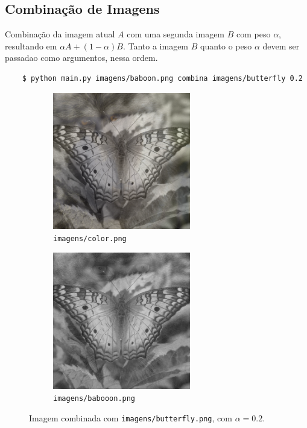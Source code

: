 \subsection{Combinação de Imagens}

Combinação da imagem atual $A$ com uma segunda imagem $B$ com peso $\alpha$, resultando em $\alpha A + (1 - \alpha) B$. Tanto a imagem $B$ quanto o peso $\alpha$ devem ser passadao como argumentos, nessa ordem.

\begin{verbatim}
    $ python main.py imagens/baboon.png combina imagens/butterfly 0.2
\end{verbatim}

\begin{figure}[H]
    \centering
    \begin{subfigure}{0.45\textwidth}
        \centering
        \includegraphics[width=6cm]{resultados/colormerg.png}
        \caption{\texttt{imagens/color.png}}
    \end{subfigure}%
    \begin{subfigure}{0.45\textwidth}
        \centering
        \includegraphics[width=6cm]{resultados/baboonmerg.png}
        \caption{\texttt{imagens/babooon.png}}
    \end{subfigure}

    \caption{Imagem combinada com \texttt{imagens/butterfly.png}, com $\alpha = 0.2$.}
\end{figure}

